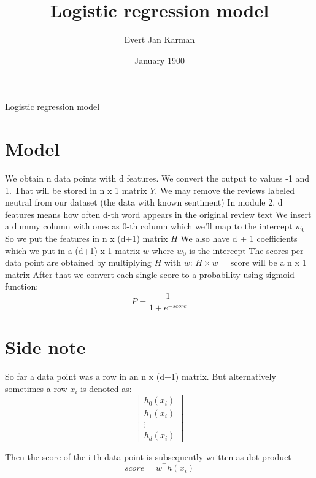 \documentclass[12pt, letterpaper]{article}
\title{Logistic regression model}
\author{Evert Jan Karman}
\date{January 1900}
\begin{document}
\maketitle

Logistic regression model

\section{Model}

We obtain n data points with d features.
\newline
We convert the output to values -1 and 1. That will be stored in n x 1 matrix \(Y\).
\newline
We may remove the reviews labeled neutral from our dataset (the data with known sentiment)
\newline
In module 2, d features means how often d-th word appears in the original review text
\newline
We insert a dummy column with ones as 0-th column which we'll map to the intercept \(w_0\)
\newline
So we put the features in n x (d+1) matrix \(H\)
\newline
We also have d + 1 coefficients which we put in a (d+1) x 1 matrix \(w\) where \(w_0\) is the intercept
\newline
The scores per data point are obtained by multiplying \(H\) with \(w\):
\newline
\(H \times w\) = score will be a n x 1 matrix
\newline
After that we convert each single score to a probability using sigmoid function:
\[
P = \frac{1}{1 + e^{-score}}
\]


\section{Side note}
So far a data point was a row in an n x (d+1) matrix. But alternatively sometimes a row \(x_i\) is denoted as:
\[
\begin{bmatrix}
h_0(x_i)\\
h_1(x_i)\\
\vdots\\
h_d(x_i)
\end{bmatrix}
\]

Then the score of the i-th data point is subsequently written as \underline{dot product}
\[
score = w^\top h(x_i)
\]
\end{document}
